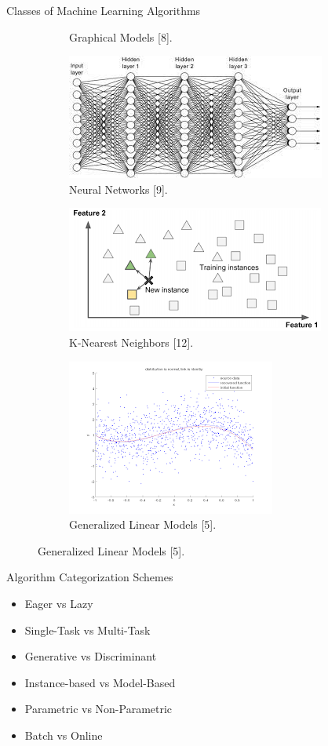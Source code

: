 \documentclass[compress,oilve]{beamer}
\begin{document}
\begin{frame}{Classes of Machine Learning Algorithms}
\begin{figure}
\begin{subfigure}{0.16\textwidth}
 \caption{Graphical Models [8].}
	\end{subfigure}
	\vfill
\begin{subfigure}{0.16\textwidth}
\centering
 \includegraphics[scale=0.25]{22}  
 \caption{Neural Networks [9].}
	\end{subfigure}
	\hfill
\begin{subfigure}{0.16\textwidth}
\centering
 \includegraphics[scale=0.25]{23}  
 \caption{K-Nearest Neighbors [12].}
	\end{subfigure}
	\hfill
\begin{subfigure}{0.16\textwidth}
\centering
 \includegraphics[scale=0.25]{19}  
 \caption{Generalized Linear Models [5].}
	\end{subfigure}
\end{figure}
\end{frame}


\begin{frame}{Algorithm Categorization Schemes}
\begin{itemize}
\item Eager vs Lazy
\item Single-Task vs Multi-Task
\item Generative vs Discriminant
\item Instance-based vs Model-Based
\item Parametric vs Non-Parametric
\item Batch vs Online
\end{itemize}
\end{frame}
\end{document}
